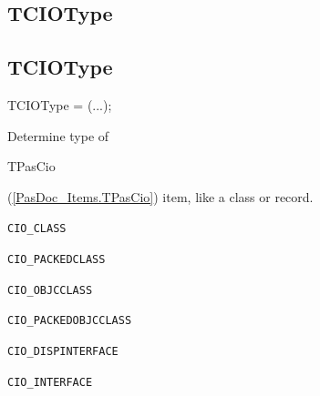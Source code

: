 \documentclass{report}
\newif\ifpdf
\begin{document}
\subsection*{\large{\textbf{TCIOType}}\normalsize\hspace{1ex}\hrulefill}
\else
\subsection*{TCIOType}
\fi
\label{PasDoc_Items-TCIOType}
\begin{list}{}{
\setlength{\itemindent}{0cm}
\setlength{\listparindent}{0cm}
\setlength{\leftmargin}{\evensidemargin}
\addtolength{\leftmargin}{\tmplength}
\settowidth{\labelsep}{X}
\addtolength{\leftmargin}{\labelsep}
\setlength{\labelwidth}{\tmplength}
}
\item[\textbf{Declaration}\hfill]
\ifpdf
\begin{flushleft}
\fi
\begin{ttfamily}
TCIOType = (...);\end{ttfamily}

\ifpdf
\end{flushleft}
\fi

\par
\item[\textbf{Description}]
Determine type of \begin{ttfamily}TPasCio\end{ttfamily}(\ref{PasDoc_Items.TPasCio}) item, like a class or record.\item[\textbf{Values}]
\begin{description}
\item[\texttt{CIO{\_}CLASS}] \label{PasDoc_Items-CIO_CLASS}
\index{}
 
\item[\texttt{CIO{\_}PACKEDCLASS}] \label{PasDoc_Items-CIO_PACKEDCLASS}
\index{}
 
\item[\texttt{CIO{\_}OBJCCLASS}] \label{PasDoc_Items-CIO_OBJCCLASS}
\index{}
 
\item[\texttt{CIO{\_}PACKEDOBJCCLASS}] \label{PasDoc_Items-CIO_PACKEDOBJCCLASS}
\index{}
 
\item[\texttt{CIO{\_}DISPINTERFACE}] \label{PasDoc_Items-CIO_DISPINTERFACE}
\index{}
 
\item[\texttt{CIO{\_}INTERFACE}] \label{PasDoc_Items-CIO_INTERFACE}
\index{}
 

\end{description}
\end{list}
\end{document}

